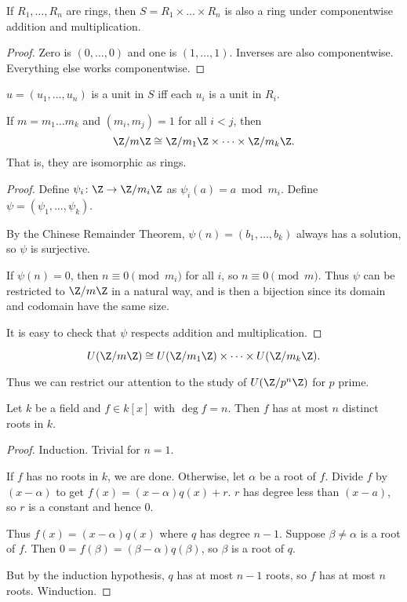 \begin{proposition}
    If $R_1, \dots, R_n$ are rings,
    then $S = R_1 \times \dots \times R_n$ is also a ring
    under componentwise addition and multiplication.
\end{proposition}
\begin{proof}
    Zero is $(0, \dots, 0)$ and one is $(1, \dots, 1)$.
    Inverses are also componentwise.
    Everything else works componentwise.
\end{proof}

\begin{exercise}
    $u = (u_1, \dots, u_n)$ is a unit in $S$ iff each $u_i$ is a unit in $R_i$.
\end{exercise}

\begin{theorem}
    If $m = m_1 \dots m_k$ and $(m_i, m_j) = 1$ for all $i < j$,
    then \[
        \Z/m\Z \cong \Z/m_1\Z \times \dots \times \Z/m_k\Z.
    \] That is, they are isomorphic as rings.
\end{theorem}
\begin{proof}
    Define $\psi_i\colon \Z \to \Z/m_i\Z$ as $\psi_i(a) = a \bmod m_i$.
    Define $\psi = (\psi_1, \dots, \psi_k)$.

    By the Chinese Remainder Theorem, $\psi(n) = (b_1, \dots, b_k)$ always
    has a solution, so $\psi$ is surjective.

    If $\psi(n) = 0$, then $n \equiv 0 \pmod{m_i}$ for all $i$,
    so $n \equiv 0 \pmod{m}$.
    Thus $\psi$ can be restricted to $\Z/m\Z$ in a natural way, and is then
    a bijection since its domain and codomain have the same size.

    It is easy to check that $\psi$ respects addition and multiplication.
\end{proof}
\begin{corollary}
    \[
        U(\Z/m\Z) \cong U(\Z/m_1\Z) \times \dots \times U(\Z/m_k\Z).
    \]
\end{corollary}
Thus we can restrict our attention to the study of
$U(\Z/p^n\Z)$ for $p$ prime.

\begin{lemma}
    Let $k$ be a field and $f \in k[x]$ with $\deg f = n$.
    Then $f$ has at most $n$ distinct roots in $k$.
\end{lemma}
\begin{proof}
    Induction.
    Trivial for $n = 1$.

    If $f$ has no roots in $k$, we are done.
    Otherwise, let $\alpha$ be a root of $f$.
    Divide $f$ by $(x - \alpha)$ to get $f(x) = (x - \alpha)q(x) + r$.
    $r$ has degree less than $(x - a)$, so $r$ is a constant and hence $0$.

    Thus $f(x) = (x - \alpha)q(x)$ where $q$ has degree $n - 1$.
    Suppose $\beta \ne \alpha$ is a root of $f$.
    Then $0 = f(\beta) = (\beta - \alpha)q(\beta)$,
    so $\beta$ is a root of $q$.

    But by the induction hypothesis, $q$ has at most $n - 1$ roots,
    so $f$ has at most $n$ roots.
    Winduction.
\end{proof}

